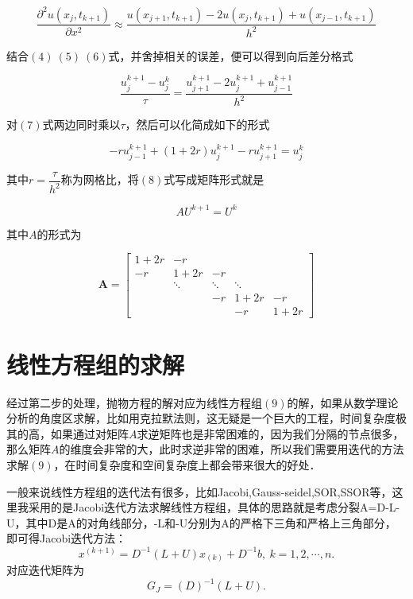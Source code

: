 \documentclass[UTF8]{ctexart}
\begin{document}
\begin{equation}
\dfrac{\partial^2u(x_j,t_{k+1})}{\partial x^2}\approx \dfrac{u(x_{j+1},t_{k+1})-2u(x_j,t_{k+1})+u(x_{j-1},t_{k+1})}{h^2}
\end{equation}

结合$(4)~(5)~(6)$式，并舍掉相关的误差，便可以得到向后差分格式

\begin{equation}
\dfrac{u_j^{k+1}-u_j^k}{\tau} = \dfrac{u_{j+1}^{k+1}-2u_j^{k+1}+u_{j-1}^{k+1}}{h^2}
\end{equation}

对$(7)$式两边同时乘以$\tau$，然后可以化简成如下的形式

\begin{equation}
-ru_{j-1}^{k+1}+(1+2r)u_j^{k+1}-ru_{j+1}^{k+1}=u_j^k
\end{equation}

其中$r=\dfrac{\tau}{h^2}$称为网格比，将$(8)$式写成矩阵形式就是

\begin{equation}
AU^{k+1}=U^k
\end{equation}

其中$A$的形式为

\[
\mathbf{A}=\left [ 
\begin{array}{ccccc}
1+2r & -r &  &  & \\
-r & 1+2r & -r &  & \\
   & \ddots & \ddots & \ddots & \\
 &  & -r & 1+2r & -r \\
 &  &  &-r  &1+2r 
\end{array}
 \right]
\]

\section{线性方程组的求解}

经过第二步的处理，抛物方程的解对应为线性方程组$(9)$的解，如果从数学理论分析的角度区求解，比如用克拉默法则，这无疑是一个巨大的工程，时间复杂度极其的高，如果通过对矩阵$A$求逆矩阵也是非常困难的，因为我们分隔的节点很多，那么矩阵$A$的维度会非常的大，此时求逆非常的困难，所以我们需要用迭代的方法求解$(9)$，在时间复杂度和空间复杂度上都会带来很大的好处．

一般来说线性方程组的迭代法有很多，比如Jacobi,Gauss-seidel,SOR,SSOR等，这里我采用的是Jacobi迭代方法求解线性方程组，具体的思路就是考虑分裂A=D-L-U，其中D是A的对角线部分，-L和-U分别为A的严格下三角和严格上三角部分，即可得Jacobi迭代方法：
\begin{equation}
x^{(k+1)} = D^{-1}(L+U)x_{(k)}+D^{-1}b,~k=1,2,\cdots,n.
\end{equation}
对应迭代矩阵为
\begin{equation}
G_{J}=(D)^{-1}(L+U).
\end{equation}
\end{document}
